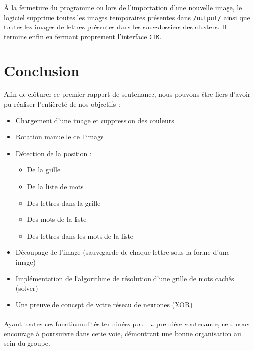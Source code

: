\documentclass{article}
\begin{document}
À la fermeture du programme ou lors de l'importation d'une nouvelle image, le logiciel supprime toutes les images temporaires présentes dans \texttt{/output/} ainsi que toutes les images de lettres présentes dans les sous-dossiers des clusters. Il termine enfin en fermant proprement l'interface \texttt{GTK}.\\
\newpage
\section{Conclusion}
\paragraph{}
Afin de cl\^oturer ce premier rapport de soutenance, nous pouvons \^etre fiers d'avoir pu r\'ealiser l'enti\`eret\'e de nos objectifs :
\begin{itemize}
    \item Chargement d'une image et suppression des couleurs 
    \item Rotation manuelle de l'image 
    \item D\'etection de la position : 
    \begin{itemize}
        \item De la grille
        \item De la liste de mots
        \item Des lettres dans la grille
        \item Des mots de la liste
        \item Des lettres dans les mots de la liste
    \end{itemize}
    \item D\'ecoupage de l'image (sauvegarde de chaque lettre sous la forme d'une image)
    \item Impl\'ementation de l'algorithme de r\'esolution d'une grille de mots cach\'es (solver)
    \item Une preuve de concept de votre r\'eseau de neurones (XOR)
\end{itemize}
\paragraph{}
Ayant toutes ces fonctionnalit\'es termin\'ees pour la premi\`ere soutenance, cela nous encourage \`a poursuivre dans cette voie, d\'emontrant une bonne organisation au sein du groupe.
\end{document}
